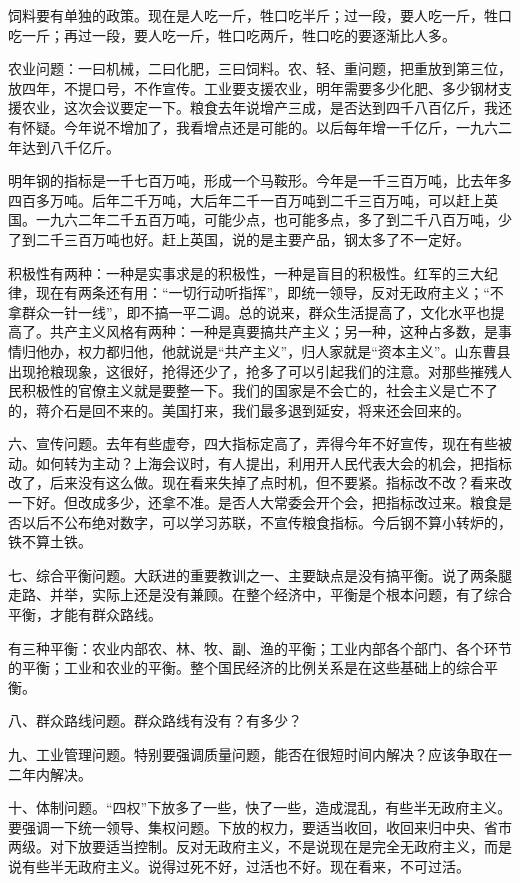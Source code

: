 饲料要有单独的政策。现在是人吃一斤，牲口吃半斤；过一段，要人吃一斤，牲口吃一斤；再过一段，要人吃一斤，牲口吃两斤，牲口吃的要逐渐比人多。

农业问题：一曰机械，二曰化肥，三曰饲料。农、轻、重问题，把重放到第三位，放四年，不提口号，不作宣传。工业要支援农业，明年需要多少化肥、多少钢材支援农业，这次会议要定一下。粮食去年说增产三成，是否达到四千八百亿斤，我还有怀疑。今年说不增加了，我看增点还是可能的。以后每年增一千亿斤，一九六二年达到八千亿斤。

明年钢的指标是一千七百万吨，形成一个马鞍形。今年是一千三百万吨，比去年多四百多万吨。后年二千万吨，大后年二千一百万吨到二千三百万吨，可以赶上英国。一九六二年二千五百万吨，可能少点，也可能多点，多了到二千八百万吨，少了到二千三百万吨也好。赶上英国，说的是主要产品，钢太多了不一定好。

积极性有两种：一种是实事求是的积极性，一种是盲目的积极性。红军的三大纪律，现在有两条还有用：“一切行动听指挥”，即统一领导，反对无政府主义；“不拿群众一针一线”，即不搞一平二调。总的说来，群众生活提高了，文化水平也提高了。共产主义风格有两种：一种是真要搞共产主义；另一种，这种占多数，是事情归他办，权力都归他，他就说是“共产主义”，归人家就是“资本主义”。山东曹县出现抢粮现象，这很好，抢得还少了，抢多了可以引起我们的注意。对那些摧残人民积极性的官僚主义就是要整一下。我们的国家是不会亡的，社会主义是亡不了的，蒋介石是回不来的。美国打来，我们最多退到延安，将来还会回来的。

六、宣传问题。去年有些虚夸，四大指标定高了，弄得今年不好宣传，现在有些被动。如何转为主动？上海会议时，有人提出，利用开人民代表大会的机会，把指标改了，后来没有这么做。现在看来失掉了点时机，但不要紧。指标改不改？看来改一下好。但改成多少，还拿不准。是否人大常委会开个会，把指标改过来。粮食是否以后不公布绝对数字，可以学习苏联，不宣传粮食指标。今后钢不算小转炉的，铁不算土铁。

七、综合平衡问题。大跃进的重要教训之一、主要缺点是没有搞平衡。说了两条腿走路、并举，实际上还是没有兼顾。在整个经济中，平衡是个根本问题，有了综合平衡，才能有群众路线。

有三种平衡：农业内部农、林、牧、副、渔的平衡；工业内部各个部门、各个环节的平衡；工业和农业的平衡。整个国民经济的比例关系是在这些基础上的综合平衡。

八、群众路线问题。群众路线有没有？有多少？

九、工业管理问题。特别要强调质量问题，能否在很短时间内解决？应该争取在一二年内解决。

十、体制问题。“四权”下放多了一些，快了一些，造成混乱，有些半无政府主义。要强调一下统一领导、集权问题。下放的权力，要适当收回，收回来归中央、省市两级。对下放要适当控制。反对无政府主义，不是说现在是完全无政府主义，而是说有些半无政府主义。说得过死不好，过活也不好。现在看来，不可过活。

